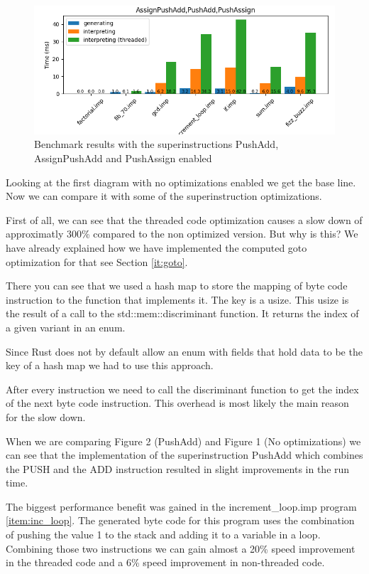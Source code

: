 \documentclass{article}
\begin{document}
\begin{figure}[h]
    \centering
    \includegraphics[width=1\textwidth]{../BenchmarkImages/AssignPushAdd_PushAdd_PushAssign.png}
    \caption{Benchmark results with the superinstructions PushAdd, AssignPushAdd and PushAssign enabled}
\end{figure}

Looking at the first diagram with no optimizations enabled we get the base
line. Now we can compare it with some of the superinstruction optimizations.

First of all, we can see that the threaded code optimization causes a slow down
of approximatly 300\% compared to the non optimized version. But why is this?
We have already explained how we have implemented the computed goto
optimization for that see Section \ref{it:goto}.

There you can see that we used a hash map to store the mapping of byte code
instruction to the function that implements it. The key is a usize. This usize
is the result of a call to the std::mem::discriminant function. It returns the
index of a given variant in an enum.

Since Rust does not by default allow an enum with fields that hold data to be
the key of a hash map we had to use this approach.

After every instruction we need to call the discriminant function to get the
index of the next byte code instruction. This overhead is most likely the main
reason for the slow down.

When we are comparing Figure 2 (PushAdd) and Figure 1 (No optimizations) we can
see that the implementation of the superinstruction PushAdd which combines the
PUSH and the ADD instruction resulted in slight improvements in the run time.

The biggest performance benefit was gained in the increment\_loop.imp program
\ref{item:inc_loop}. The generated byte code for this program uses the
combination of pushing the value 1 to the stack and adding it to a variable in
a loop. Combining those two instructions we can gain almost a 20\% speed
improvement in the threaded code and a 6\% speed improvement in non-threaded
code.
\end{document}
